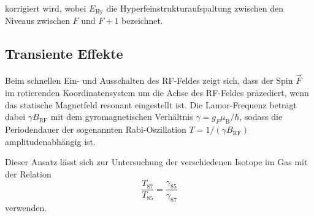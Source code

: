  korrigiert wird, wobei $E_\text{Hy}$ die Hyperfeinstrukturaufspaltung zwischen den Niveaus zwischen $F$ und $F+1$ bezeichnet.

  \subsection{Transiente Effekte}
  \label{subsec:transient}
  Beim schnellen Ein- und Ausschalten des RF-Feldes zeigt sich, dass der Spin $\vec{F}$ im rotierenden Koordinatensystem um die Achse des RF-Feldes präzediert, wenn das statische Magnetfeld resonant eingestellt ist. Die Lamor-Frequenz beträgt dabei $\gamma B_{\text{RF}}$ mit dem gyromagnetischen Verhältnis $\gamma = g_F \mu_{\text{B}}/\hbar$, sodass die Periodendauer der sogenannten Rabi-Oszillation $T=1/(\gamma B_\text{RF})$ amplitudenabhängig ist.

  Dieser Ansatz lässt sich zur Untersuchung der verschiedenen Isotope im Gas mit der Relation
  \begin{equation}
    \frac{T_{87}}{T_{85}} = \frac{\gamma_{85}}{\gamma_{87}}
    \label{eqn:transient}
  \end{equation}
  verwenden.
